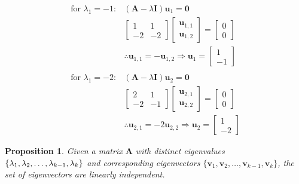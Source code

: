 \documentclass[a4paper,12pt]{article}
\newcommand{\matrx}[1]{\bm{#1}}
\newcommand{\vectr}[1]{\textbf{#1}}
\newtheorem{proposition}{Proposition}[section]
\begin{document}
	\begin{align}
		\text{for } \lambda_1 = -1:&
		(\matrx{A} - \lambda \matrx{I}) \vectr{u}_1 = \vectr{0} \\
		& \begin{bmatrix}
			1 & 1 \\
			-2 & -2
		\end{bmatrix} \begin{bmatrix}
			\vectr{u}_{1,1} \\
			\vectr{u}_{1,2}
		\end{bmatrix} = \begin{bmatrix}
			0 \\
			0
		\end{bmatrix} \\
		&\therefore \vectr{u}_{1,1} = -\vectr{u}_{1,2} \Rightarrow \vectr{u}_1 = \begin{bmatrix}
			1 \\
			-1
		\end{bmatrix} \label{eq:eigen_eigenvector_1_ex} \\ \\
		\text{for } \lambda_1 = -2:&
		(\matrx{A} - \lambda \matrx{I}) \vectr{u}_2 = \vectr{0} \\
		& \begin{bmatrix}
			2 & 1 \\
			-2 & -1
		\end{bmatrix} \begin{bmatrix}
			\vectr{u}_{2,1} \\
			\vectr{u}_{2,2}
		\end{bmatrix} = \begin{bmatrix}
			0 \\
			0
		\end{bmatrix} \\
		&\therefore \vectr{u}_{2,1} = -2 \vectr{u}_{2,2} \Rightarrow \vectr{u}_2 = \begin{bmatrix}
			1 \\
			-2
		\end{bmatrix} \label{eq:eigen_eigenvector_2_ex} 
	\end{align}
	\begin{proposition}
		\normalfont Given a matrix $ \matrx{A} $ with distinct eigenvalues $ \{\lambda_1,\lambda_2,\ldots \\,\lambda_{k - 1},\lambda_k\} $ and corresponding eigenvectors $ \{\vectr{v}_1,\vectr{v}_2,\ldots,\vectr{v}_{k - 1},\vectr{v}_k\} $, the set of eigenvectors are linearly independent.
		\label{prop:eigenvectors_linearly_independent}
	\end{proposition}
\end{document}
